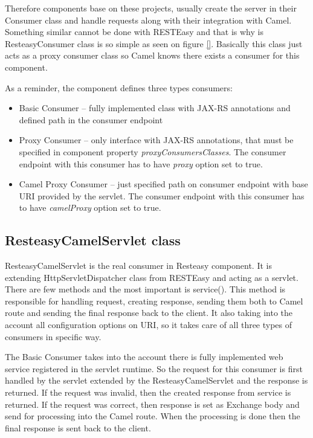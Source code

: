 \documentclass[12pt,final,oneside]{fithesis2}
\begin{document}
Therefore components base on these projects, usually create the server in their Consumer class and handle requests along with their integration with Camel. Something similar cannot be done with RESTEasy and that is why is ResteasyConsumer class is so simple as seen on figure \ref{}. Basically this class just acts as a proxy consumer class so Camel knows there exists a consumer for this component.

As a reminder, the component defines three types consumers:
\begin{itemize}
\item
Basic Consumer  -- fully implemented class with JAX-RS annotations and defined path in the consumer endpoint

\item
Proxy Consumer -- only interface with JAX-RS annotations, that must be specified in component property \textit{proxyConsumersClasses}. The consumer endpoint with this consumer has to have \textit{proxy} option set to true. 

\item
Camel Proxy Consumer -- just specified path on consumer endpoint with base URI provided by the servlet. The consumer endpoint with this consumer has to have \textit{camelProxy} option set to true. 
\end{itemize}




\subsection{ResteasyCamelServlet class}\label{servlet}
ResteasyCamelServlet is the real consumer in Resteasy component. It is extending HttpServletDispatcher class from RESTEasy and acting as a servlet. There are few methods and the most important is service(). This method is responsible for handling request, creating response, sending them both to Camel route and sending the final response back to the client. It also taking into the account all configuration options on URI, so it takes care of all three types of consumers in specific way. 

The Basic Consumer takes into the account there is fully implemented web service registered in the servlet runtime. So the request for this consumer is first handled by the servlet extended by the ResteasyCamelServlet and the response is returned. If the request was invalid, then the created response from service is returned. If the request was correct, then response is set as Exchange body and send for processing into the Camel route. When the processing is done then the final response is sent back to the client. 
\end{document}
